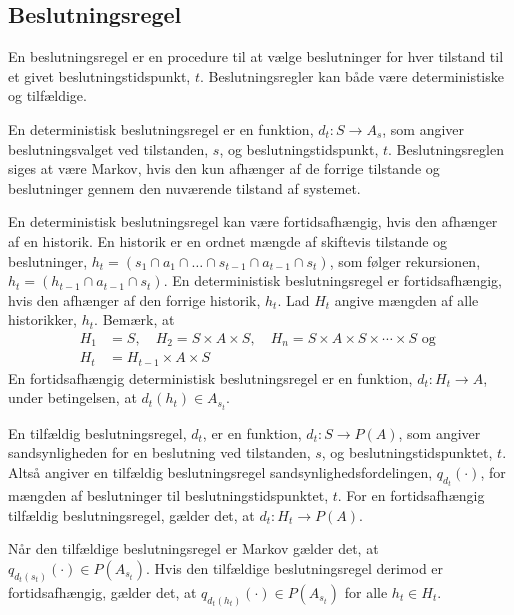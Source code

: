 


\subsection{Beslutningsregel}\label{afsnit:beslutningsregel}
En beslutningsregel er en procedure til at vælge beslutninger for hver tilstand til et givet beslutningstidspunkt, $t$. Beslutningsregler kan både være deterministiske og tilfældige.%

En deterministisk beslutningsregel er en funktion, $d_t:S\to A_s$, som angiver beslutningsvalget ved tilstanden, $s$, og beslutningstidspunkt, $t$. Beslutningsreglen siges at være Markov, hvis den kun afhænger af de forrige tilstande og beslutninger gennem den nuværende tilstand af systemet. 

En deterministisk beslutningsregel kan være fortidsafhængig, hvis den afhænger af en historik. En historik er en ordnet mængde af skiftevis tilstande og beslutninger, $h_t = (s_1 \cap a_1\cap \dots\cap s_{t-1}\cap a_{t-1}\cap s_t)$, som følger rekursionen, $h_t=(h_{t-1}\cap a_{t-1}\cap s_t)$. En deterministisk beslutningsregel er fortidsafhængig, hvis den afhænger af den forrige historik, $h_t$.
Lad $H_t$ angive mængden af alle historikker, $h_t$. Bemærk, at 
\begin{align*}
    H_1&=S, \quad H_2=S\times A\times S, \quad H_n =S\times A\times S\times \cdots \times S \text{ og }\\
    H_t&=H_{t-1}\times A\times S 
\end{align*}
En fortidsafhængig deterministisk beslutningsregel er en funktion, $d_t: H_t\to A$, under betingelsen, at $d_t(h_t)\in A_{s_t}$.

En tilfældig beslutningsregel, $d_t$, er en funktion, $d_t: S\to P(A)$, som angiver sandsynligheden for en beslutning ved tilstanden, $s$, og beslutningstidspunktet, $t$. Altså angiver en tilfældig beslutningsregel sandsynlighedsfordelingen, $q_{d_t}(\cdot)$, for mængden af beslutninger til beslutningstidspunktet, $t$. For en fortidsafhængig tilfældig beslutningsregel, gælder det, at $d_t:H_t\to P(A)$.

Når den tilfældige beslutningsregel er Markov gælder det, at $q_{d_t(s_t)}(\cdot)\in P(A_{s_t})$. Hvis den tilfældige beslutningsregel derimod er fortidsafhængig, gælder det, at $q_{d_t(h_t)}(\cdot)\in P(A_{s_t})$ for alle $h_t\in H_t$.

